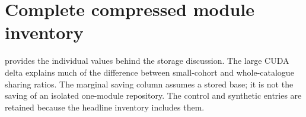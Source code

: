 \section{Complete compressed module inventory}

 provides the individual values behind the storage discussion. The large CUDA delta explains much of the difference between small-cohort and whole-catalogue sharing ratios. The marginal saving column assumes a stored base; it is not the saving of an isolated one-module repository. The control and synthetic entries are retained because the headline inventory includes them.


